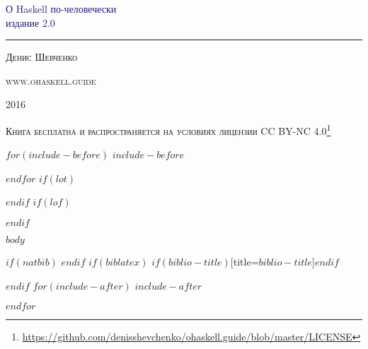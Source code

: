 \documentclass[11pt,oneside]{book}
\date{$date$}
\renewcommand{\href}[2]{#2\footnote{\url{#1}}}
\newcommand*{\ohaskelltitle}{\begingroup
\newlength{\drop} %
\drop=0.1\textheight %

\vspace{\drop} %
\centering %
\textcolor{MidnightBlue}{ %
{\Huge О Haskell по-человечески}\\[0.5\baselineskip] %
\vspace{15pt}
{\Large издание 2.0}
} %

\vspace{0.25\drop}
\rule{0.3\textwidth}{0.4pt}\par
\vspace{\drop}

{\large \textsc{Денис Шевченко}}\par

\vfill
{\large \textsc{www.ohaskell.guide}}\par
{\Large \textsc{2016}}\par
\endgroup}
\newcommand*{\ohaskelllicense}{\begingroup
\vspace*{\fill}
\centering
{\large \textsc{Книга бесплатна и распространяется на условиях лицензии \href{https://github.com/denisshevchenko/ohaskell.guide/blob/master/LICENSE}{CC BY-NC 4.0}}}\par
\vspace*{\fill}
\endgroup}
\begin{document}
\pagestyle{empty}
\ohaskelltitle
\newpage
\pagestyle{empty}
\ohaskelllicense

$for(include-before)$
$include-before$

$endfor$
{
\hypersetup{linkcolor=black}
\setcounter{tocdepth}{1}
\pagestyle{empty}
\tableofcontents
\thispagestyle{empty}
\clearpage
}
$if(lot)$
\listoftables
$endif$
$if(lof)$
\listoffigures
$endif$

\pagestyle{fancy}
\fancyhf{}
\lhead{\nouppercase{\rightmark}}
\rhead{\nouppercase{\leftmark}}
\fancyfoot[C]{\thepage}
$body$

$if(natbib)$
$endif$
$if(biblatex)$
\printbibliography$if(biblio-title)$[title=$biblio-title$]$endif$

$endif$
$for(include-after)$
$include-after$

$endfor$
\end{document}
